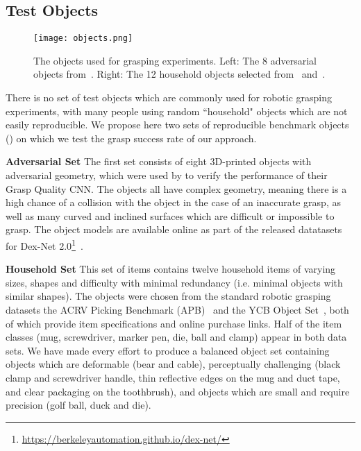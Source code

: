 \documentclass[conference]{IEEEtran}
\begin{document}
\subsection{Test Objects}
\label{sec:objects}

\begin{figure}[tpb]
    \centering
    \texttt{[image: objects.png]}
    \vspace{-6mm}
    \caption{The objects used for grasping experiments. Left: The 8 adversarial objects from~\cite{Mahler2017Dex2}. Right: The 12 household objects selected from~\cite{calli2017ycb} and~\cite{leitner2017acrvpicking}.
    }
  \label{fig:objects} 
  \vspace{-6mm}
\end{figure}

There is no set of test objects which are commonly used for robotic grasping experiments, with many people using random ``household" objects which are not easily reproducible.  We propose here two sets of reproducible benchmark objects () on which we test the grasp success rate of our approach.

\textbf{Adversarial Set} The first set consists of eight 3D-printed objects with adversarial geometry, which were used by \citet{Mahler2017Dex2} to verify the performance of their Grasp Quality CNN.  The objects all have complex geometry, meaning there is a high chance of a collision with the object in the case of an inaccurate grasp, as well as many curved and inclined surfaces which are difficult or impossible to grasp.  The object models are available online as part of the released datatasets for Dex-Net 2.0\footnote{\href{https://berkeleyautomation.github.io/dex-net/}{https://berkeleyautomation.github.io/dex-net/}}~\cite{Mahler2017Dex2}.

\textbf{Household Set} This set of items contains twelve household items of varying sizes, shapes and difficulty with minimal redundancy (i.e. minimal objects with similar shapes).  The objects were chosen from the standard robotic grasping datasets the ACRV Picking Benchmark (APB)~\cite{leitner2017acrvpicking} and the YCB Object Set~\cite{calli2017ycb}, both of which provide item specifications and online purchase links.  Half of the item classes (mug, screwdriver, marker pen, die, ball and clamp) appear in both data sets.  We have made every effort to produce a balanced object set containing objects which are deformable (bear and cable), perceptually challenging (black clamp and screwdriver handle, thin reflective edges on the mug and duct tape, and clear packaging on the toothbrush), and objects which are small and require precision (golf ball, duck and die). 
\end{document}
